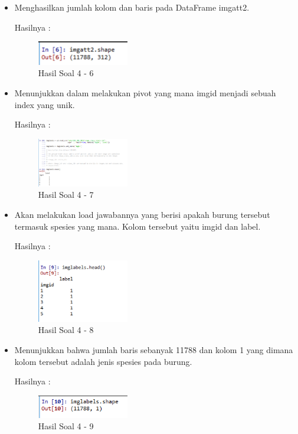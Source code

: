 \begin{enumerate}
\begin{itemize}
\item Menghasilkan jumlah kolom dan baris pada DataFrame imgatt2.

Hasilnya :
\begin{figure}[H]
	\centering
		\includegraphics[width=4cm]{figures/1174054/3/12.png}
		\caption{Hasil Soal 4 - 6}
\end{figure}
		
\item Menunjukkan dalam melakukan pivot yang mana imgid menjadi sebuah index yang unik.

Hasilnya :
\begin{figure}[H]
	\centering
		\includegraphics[width=4cm]{figures/1174054/3/13.png}
		\caption{Hasil Soal 4 - 7}
\end{figure}
		
\item Akan melakukan load jawabannya yang berisi apakah burung tersebut termasuk spesies yang mana. Kolom tersebut yaitu imgid dan label.

Hasilnya :
\begin{figure}[H]
	\centering
		\includegraphics[width=4cm]{figures/1174054/3/14.png}
		\caption{Hasil Soal 4 - 8}
\end{figure}
		
\item Menunjukkan bahwa jumlah baris sebanyak 11788 dan kolom 1 yang dimana kolom tersebut adalah jenis spesies pada burung.

Hasilnya :
\begin{figure}[H]
	\centering
		\includegraphics[width=4cm]{figures/1174054/3/15.png}
		\caption{Hasil Soal 4 - 9}
\end{figure}
		

\end{itemize}
\end{enumerate}
